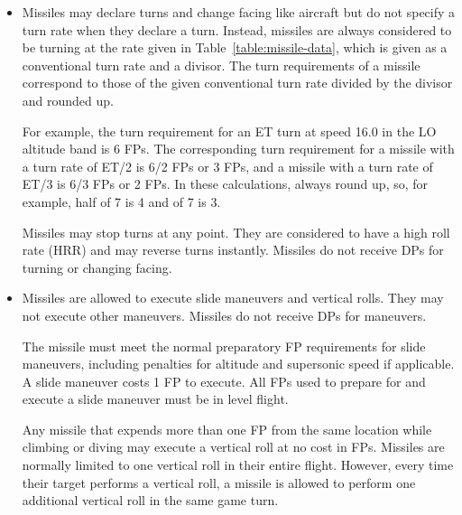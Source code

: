 {\begin{itemize}
\begin{itemize}
    \end{itemize}

    \item {} Missiles may declare turns and change facing like aircraft but do not specify a turn rate when they declare a turn. Instead, missiles are always considered to be turning at the rate given in Table~\ref{table:missile-data}, which is given as a conventional turn rate and a divisor. The turn requirements of a missile correspond to those of the given conventional turn rate divided by the divisor and rounded up.
    
    For example, the turn requirement for an ET turn at speed 16.0 in the LO altitude band is 6 FPs. The corresponding turn requirement for a missile with a turn rate of ET/2 is 6/2 FPs or 3 FPs, and a missile with a turn rate of ET/3 is 6/3 FPs or 2 FPs. In these calculations, always round up, so, for example, half of 7 is 4 and {\onethird} of 7 is 3.
    
    Missiles may stop turns at any point. They are considered to have a high roll rate (HRR) and may reverse turns instantly. Missiles do not receive DPs for turning or changing facing. 

    \item {} Missiles are allowed to execute slide maneuvers and vertical rolls. They may not execute other maneuvers. Missiles do not receive DPs for maneuvers. 

    The missile must meet the normal preparatory FP requirements for slide maneuvers, including penalties for altitude and supersonic speed if applicable. A slide maneuver costs 1 FP to execute. All FPs used to prepare for and execute a slide maneuver must be in level flight.
        
    Any missile that expends more than one FP from the same location while climbing or diving may execute a vertical roll at no cost in FPs. Missiles are normally limited to one vertical roll in their entire flight. However, every time their target performs a vertical roll, a missile is allowed to perform one additional vertical roll in the same game turn.

\end{itemize}
}


